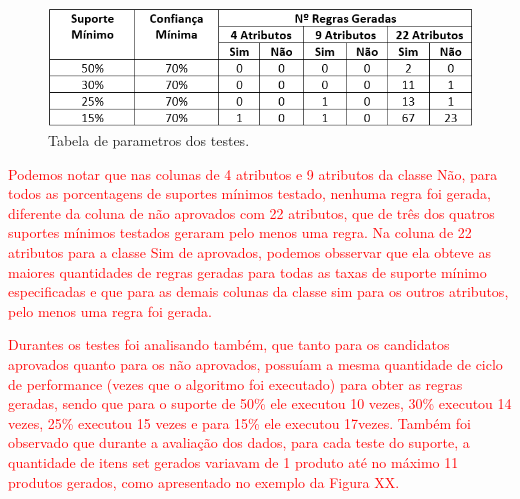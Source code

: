\par
\begin{figure}[!htp]
	\begin{center}
    \caption{\label{fig:waveform_fig} Tabela de parametros dos testes.}
	\includegraphics[scale=0.90]{Figuras/Tabela_de_parametros_apriori.png}
	\end{center}
\end{figure}

\par
\textcolor{red}{Podemos notar que nas colunas de 4 atributos e 9 atributos da classe Não, para todos as porcentagens de suportes mínimos testado, nenhuma regra foi gerada, diferente da coluna de não aprovados com 22 atributos, que de três dos quatros suportes mínimos testados geraram pelo menos uma regra. Na coluna de 22 atributos para a classe Sim de aprovados, podemos obsservar que ela obteve as maiores quantidades de regras geradas para todas as taxas de suporte mínimo especificadas e que para as demais colunas da classe sim para os outros atributos, pelo menos uma regra foi gerada.}

\par
\textcolor{red}{Durantes os testes foi analisando também, que tanto para os candidatos aprovados quanto para os não aprovados, possuíam a mesma quantidade de ciclo de performance (vezes que o algoritmo foi executado) para obter as regras geradas, sendo que para o suporte de 50\% ele executou 10 vezes, 30\% executou 14 vezes, 25\% executou 15 vezes e para 15\% ele executou 17vezes. Também foi observado que durante a avaliação dos dados, para cada teste do suporte, a quantidade de itens set gerados variavam de 1 produto até no máximo 11 produtos gerados, como apresentado no exemplo da Figura XX.}


